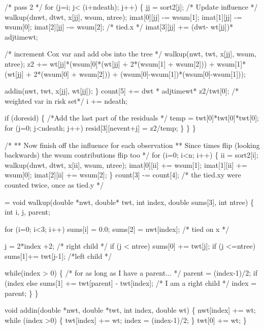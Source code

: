 \documentclass{article}
\begin{document}
\begin{nwchunk}
         /* pass 2 */
         for (j=i; j< (i+ndeath); j++) \{
             jj = sort2[j];
             /* Update influence */
             walkup(dnwt, dtwt, x[jj], wsum, ntree);
             imat[0][jj] -= wsum[1];
             imat[1][jj] -= wsum[0];
             imat[2][jj] -= wsum[2];  /* tied.x */
             imat[3][jj] += (dwt- wt[jj])* adjtimewt;
  
             /* increment Cox var and add obs into the tree */
             walkup(nwt, twt, x[jj], wsum, ntree);
             z2 += wt[jj]*(wsum[0]*(wt[jj] + 2*(wsum[1] + wsum[2])) +
                           wsum[1]*(wt[jj] + 2*(wsum[0] + wsum[2])) +
                           (wsum[0]-wsum[1])*(wsum[0]-wsum[1]));
 
             addin(nwt, twt, x[jj], wt[jj]); 
         \}
         count[5] += dwt * adjtimewt* z2/twt[0]; /* weighted var in risk set*/
         i += ndeath;
 
         if (doresid) \{ /*Add the last part of the residuals */
             temp = twt[0]*twt[0]*twt[0];
             for (j=0; j<ndeath; j++)
                 resid[3][nevent+j] = z2/temp;
         \}
     \}
 \}
 
 /* 
 ** Now finish off the influence for each observation 
 **  Since times flip (looking backwards) the wsum contributions flip too
 */
 for (i=0; i<n; i++) \{
     ii = sort2[i];
     walkup(dnwt, dtwt, x[ii], wsum, ntree);
     imat[0][ii] += wsum[1];
     imat[1][ii] += wsum[0];
     imat[2][ii] += wsum[2];
 \}
 count[3] -= count[4];   /* the tied.xy were counted twice, once as tied.y */
\end{nwchunk}

\begin{nwchunk}
=
 void walkup(double *nwt, double* twt, int index, double sums[3], int ntree) \{
     int i, j, parent;
 
     for (i=0; i<3; i++) sums[i] = 0.0;
     sums[2] = nwt[index];   /* tied on x */
     
     j = 2*index +2;  /* right child */
     if (j < ntree) sums[0] += twt[j];
     if (j <=ntree) sums[1]+= twt[j-1]; /*left child */
 
     while(index > 0) \{ /* for as long as I have a parent... */
         parent = (index-1)/2;
         if (index%
         else sums[1] += twt[parent] - twt[index]; /* I am a right child */
         index = parent;
     \}
 \}
 
 void addin(double *nwt, double *twt, int index, double wt) \{
     nwt[index] += wt;
     while (index >0) \{
         twt[index] += wt;
         index = (index-1)/2;
     \}
     twt[0] += wt;
 \}
\end{nwchunk}
\end{document}
